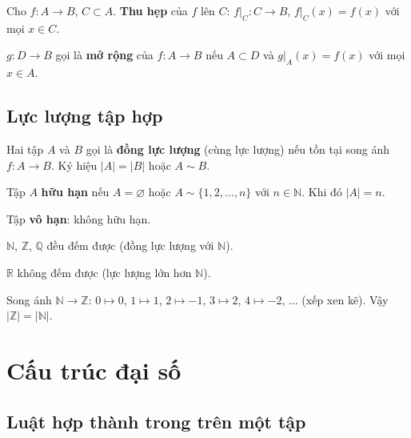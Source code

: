 \documentclass[12pt,a4paper]{article}
\begin{document}
\begin{dinhnghia}
  Cho $f: A \to B$, $C \subset A$. \textbf{Thu hẹp} của $f$ lên $C$: $f|_C: C \to B$, $f|_C(x) = f(x)$ với mọi $x \in C$.
\end{dinhnghia}

\begin{dinhnghia}
  $g: D \to B$ gọi là \textbf{mở rộng} của $f: A \to B$ nếu $A \subset D$ và $g|_A(x) = f(x)$ với mọi $x \in A$.
\end{dinhnghia}

\subsection{Lực lượng tập hợp}

\begin{dinhnghia}
  Hai tập $A$ và $B$ gọi là \textbf{đồng lực lượng} (cùng lực lượng) nếu tồn tại song ánh $f: A \to B$. Ký hiệu $|A| = |B|$ hoặc $A \sim B$.
\end{dinhnghia}

\begin{dinhnghia}
  Tập $A$ \textbf{hữu hạn} nếu $A = \varnothing$ hoặc $A \sim \{1, 2, \ldots, n\}$ với $n \in \mathbb{N}$. Khi đó $|A| = n$. 
  
  Tập \textbf{vô hạn}: không hữu hạn.
\end{dinhnghia}

\begin{dinhly}
  $\mathbb{N}$, $\mathbb{Z}$, $\mathbb{Q}$ đều đếm được (đồng lực lượng với $\mathbb{N}$). 
  
  $\mathbb{R}$ không đếm được (lực lượng lớn hơn $\mathbb{N}$).
\end{dinhly}

\begin{vidu}
  Song ánh $\mathbb{N} \to \mathbb{Z}$: $0 \mapsto 0$, $1 \mapsto 1$, $2 \mapsto -1$, $3 \mapsto 2$, $4 \mapsto -2$, $\ldots$ (xếp xen kẽ). Vậy $|\mathbb{Z}| = |\mathbb{N}|$.
\end{vidu}

\section{Cấu trúc đại số}

\subsection{Luật hợp thành trong trên một tập}
\end{document}
